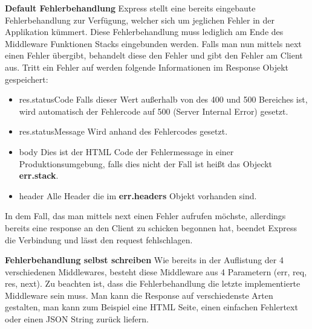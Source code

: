 \textbf{Default Fehlerbehandlung}
\newline
Express stellt eine bereits eingebaute Fehlerbehandlung zur Verfügung, welcher sich um jeglichen Fehler in der Applikation kümmert. Diese Fehlerbehandlung muss lediglich am Ende des Middleware Funktionen Stacks eingebunden werden. Falls man nun mittels next einen Fehler übergibt, behandelt diese den Fehler und gibt den Fehler am Client aus. Tritt ein Fehler auf werden folgende Informationen im Response Objekt gespeichert:
\begin{itemize}
    \item res.statusCode
        \newline
        Falls dieser Wert außerhalb von des 400 und 500 Bereiches ist, wird automatisch der Fehlercode auf 500 (Server Internal Error) gesetzt.
    \item res.statusMessage
        \newline
        Wird anhand des Fehlercodes gesetzt.
    \item body
        \newline
        Dies ist der HTML Code der Fehlermessage in einer Produktionsumgebung, falls dies nicht der Fall ist heißt das Objeckt \textbf{err.stack}.
    \item header
        \newline
        Alle Header die im \textbf{err.headers} Objekt vorhanden sind.
\end{itemize}
In dem Fall, das man mittels next einen Fehler aufrufen möchste, allerdings bereits eine response an den Client zu schicken begonnen hat, beendet Express die Verbindung und lässt den request fehlschlagen.

\textbf{Fehlerbehandlung selbst schreiben}
\newline
Wie bereits in der Auflistung der 4 verschiedenen Middlewares, besteht diese Middleware aus 4 Parametern (err, req, res, next). Zu beachten ist, dass die Fehlerbehandlung die letzte implementierte Middleware sein muss. Man kann die Response auf verschiedenste Arten gestalten, man kann zum Beispiel eine HTML Seite, einen einfachen Fehlertext oder einen JSON String zurück liefern.
\cite{express_js_error_handling}

